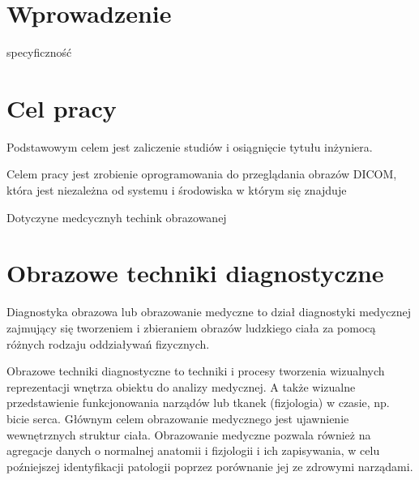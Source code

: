 \section{Wprowadzenie}

specyficzność

\section{Cel pracy}

Podstawowym celem jest zaliczenie studiów i osiągnięcie tytułu inżyniera.

Celem pracy jest zrobienie oprogramowania do przeglądania obrazów DICOM, która jest niezależna od systemu i środowiska w którym się znajduje

Dotyczyne medcycznyh techink obrazowanej

\section{Obrazowe techniki diagnostyczne}

Diagnostyka obrazowa lub obrazowanie medyczne to dział diagnostyki medycznej zajmujący się tworzeniem i zbieraniem obrazów ludzkiego ciała za pomocą różnych rodzaju oddziaływań fizycznych.

Obrazowe techniki diagnostyczne to techniki i procesy tworzenia wizualnych reprezentacji wnętrza obiektu do analizy medycznej.
A także wizualne przedstawienie funkcjonowania narządów lub tkanek (fizjologia) w czasie, np. bicie serca.
Głównym celem obrazowanie medycznego jest ujawnienie wewnętrznych struktur ciała.
Obrazowanie medyczne pozwala również na agregacje danych o normalnej anatomii i fizjologii i ich zapisywania, w celu poźniejszej identyfikacji patologii poprzez porównanie jej ze zdrowymi narządami.

